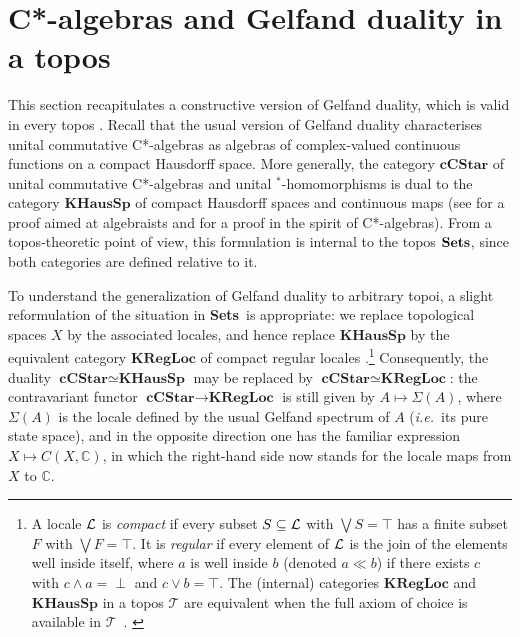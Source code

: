 \documentclass[12pt]{article}
\newcommand{\Sets}{\mbox{\textbf{Sets}}}
\newcommand{\ca}{C*-algebra} \newcommand{\jba}{JB-algebra}
\newcommand{\raw}{\rightarrow} \newcommand{\rat}{\mapsto}
\newcommand{\Sg}{\Sigma} \newcommand{\ta}{\tau} \newcommand{\ph}{\phi}
\newcommand{\CT}{{\mathcal T}} \newcommand{\CV}{{\mathcal V}}
\newcommand{\C}{{\mathbb C}} \newcommand{\D}{{\mathbb D}}
\newcommand{\Cat}[1]{\ensuremath{\mathrm{\textbf{#1}}}}
\newcommand{\Ccstar}{\Cat{cCStar}\xspace}
\newcommand{\ie}{\textit{i.e.}}
\begin{document}
\section{\ca s and Gelfand duality in a topos}
\label{sec:constructivecstaralgebra}

This section recapitulates a constructive version of Gelfand duality, which is
 valid in every topos
  \cite{banaschewskimulvey00b,banaschewskimulvey00a,banaschewskimulvey06}.
Recall that the usual version of Gelfand duality characterises
 unital commutative  C*-algebras as algebras of complex-valued continuous
functions on
a compact Hausdorff space. More generally, the category $\Ccstar$ of  unital
commutative  C*-algebras and unital $\mbox{}^*$-homomorphisms is dual to the
category $\Cat{KHausSp}$ of compact Hausdorff spaces and continuous maps (see
\cite{johnstone82} for a proof aimed at algebraists and \cite{NPLCK} for a proof
in the spirit of \ca s). From a topos-theoretic point of view, this formulation
is internal to the topos $\Sets$, since both categories are defined relative to
it.

To understand the generalization of Gelfand duality to arbitrary topoi, a slight
reformulation
of the situation in  \Sets\ is appropriate: we replace topological spaces $X$ by
the associated locales, and hence replace $\Cat{KHausSp}$ by  the
equivalent category  $\Cat{KRegLoc}$ of compact regular locales
\cite{johnstone82}.\footnote{A locale ${\mathcal L}$ is {\it compact} if every
subset $S\subseteq {\mathcal L}$ with $\bigvee S=\top$ has a finite subset $F$
with $\bigvee F=\top$. It is {\it regular} if every element of ${\mathcal L}$
is the join of the elements well inside itself, where $a$ is well
inside $b$ (denoted  $a \ll b$) if there exists $c$ with $c\wedge
a=\perp$ and $c\vee b=\top$. The (internal) categories
$\Cat{KRegLoc}$ and $\Cat{KHausSp}$ in a topos $\CT$ are equivalent
when the full axiom of choice is available in
$\CT$~\cite{johnstone82}. \label{footnote:compactlocale}
} Consequently, the duality $\Ccstar\simeq \Cat{KHausSp}$ may be replaced by
$\Ccstar\simeq \Cat{KRegLoc}$: the contravariant functor $\Ccstar\raw
\Cat{KRegLoc}$
is still given by $A\mapsto \Sigma(A)$, where $\Sg(A)$ is the locale defined by
the usual Gelfand spectrum of $A$ (\ie\ its pure state space), and in the
opposite direction one has
the familiar expression $X\mapsto C(X,\C)$, in which  the right-hand side now
stands for
the locale maps from $X$ to $\C$.
\end{document}

